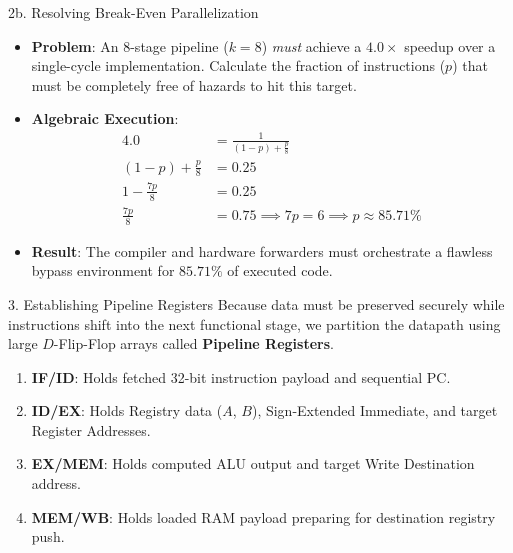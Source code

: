 \documentclass[aspectratio=169]{beamer}
\begin{document}
\begin{frame}{2b. Resolving Break-Even Parallelization}
\begin{itemize}
    \item \textbf{Problem}: An 8-stage pipeline ($k=8$) \textit{must} achieve a $4.0\times$ speedup over a single-cycle implementation. Calculate the fraction of instructions ($p$) that must be completely free of hazards to hit this target.
    \item \textbf{Algebraic Execution}:
    \begin{align*}
        4.0 &= \frac{1}{(1-p) + \frac{p}{8}} \\
        (1-p) + \frac{p}{8} &= 0.25 \\
        1 - \frac{7p}{8} &= 0.25 \\
        \frac{7p}{8} &= 0.75 \implies 7p = 6 \implies p \approx 85.71\%
    \end{align*}
    \item \textbf{Result}: The compiler and hardware forwarders must orchestrate a flawless bypass environment for $85.71\%$ of executed code.
\end{itemize}
\end{frame}

\begin{frame}{3. Establishing Pipeline Registers}
Because data must be preserved securely while instructions shift into the next functional stage, we partition the datapath using large $D$-Flip-Flop arrays called \textbf{Pipeline Registers}.
\vspace{0.2cm}
\begin{enumerate}
    \item \textbf{IF/ID}: Holds fetched 32-bit instruction payload and sequential PC.
    \item \textbf{ID/EX}: Holds Registry data ($A$, $B$), Sign-Extended Immediate, and target Register Addresses.
    \item \textbf{EX/MEM}: Holds computed ALU output and target Write Destination address.
    \item \textbf{MEM/WB}: Holds loaded RAM payload preparing for destination registry push.
\end{enumerate}
\end{frame}
\end{document}
